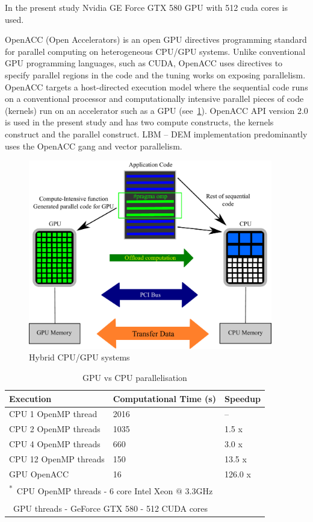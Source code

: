 In the present study Nvidia GE Force GTX 580 GPU with 512 cuda cores is used.

OpenACC (Open Accelerators) is an open GPU directives programming standard for 
parallel computing on heterogeneous CPU/GPU systems. Unlike conventional GPU 
programming languages, such as CUDA, OpenACC uses directives to specify 
parallel regions in the code and the tuning works on exposing parallelism. 
OpenACC targets a host-directed execution model where the sequential code runs 
on a conventional processor and computationally intensive parallel pieces of 
code (kernels) run on an accelerator such as a GPU 
(see~\cref{fig:GPUConcept}). 
OpenACC API version 2.0 is used in the present study and has two 
compute 
constructs, the kernels construct and the parallel construct. LBM -- 
DEM 
implementation predominantly uses the OpenACC gang and vector 
parallelism.
 

\begin{figure}[tbhp]
	\centering
	\includegraphics[width=0.95\textwidth]{GPU_Concept}
	\caption{Hybrid CPU/GPU systems}
	\label{fig:GPUConcept}
\end{figure}

\begin{table}[tbhp]
	\caption{GPU vs CPU parallelisation}
	\label{table:GPU}
	\centering
	\begin{tabular}{l l l}
		\toprule
		Execution & Computational Time (s) &  Speedup \\
		\midrule
		CPU 1 OpenMP thread		& 2016	 & -- \\
		CPU 2 OpenMP threads	& 1035	 & 1.5 x \\
		CPU 4 OpenMP threads	& 660 	 & 3.0 x \\
		CPU 12 OpenMP threads	& 150	 & 13.5 x\\
		GPU OpenACC				& 16	 & 126.0 x \\
		\bottomrule
		\multicolumn{3}{l}{\footnotesize{\textsuperscript{*}~CPU OpenMP threads 
		- 6 core Intel Xeon $\mathrm{@}$ 3.3GHz}} \\
		\multicolumn{3}{l}{\footnotesize{\textsuperscript{\dag}~GPU threads - 
		GeForce GTX 580 - 512 CUDA cores}}
	\end{tabular}
\end{table}




